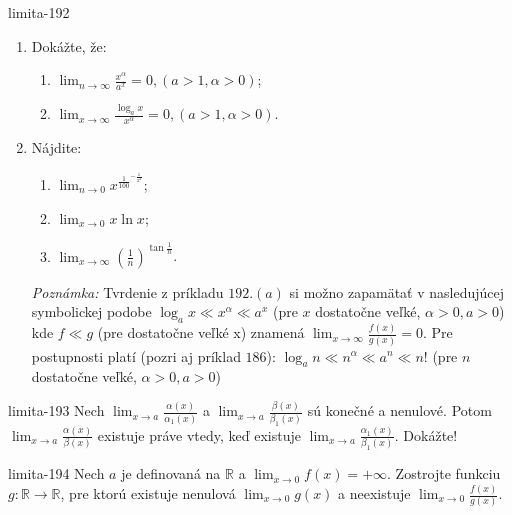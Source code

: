 \begin{defproblem}{limita-192}
\begin{enumerate}
\item Dokážte, že:
\begin{multicols}{2}
\begin{enumerate}
    \item $\lim_{n \rightarrow \infty} \frac{x^{\alpha}}{a^x}=0,(a>1,\alpha>0)$;
    \item $\lim_{x \rightarrow \infty} \frac{\log_a x}{x^\alpha}=0,(a>1,\alpha >0)$.
\end{enumerate}
\end{multicols}
\item Nájdite:
\begin{multicols}{2}
\begin{enumerate}
    \item $\lim_{n \rightarrow 0} x^{\frac{1}{100}^{-\frac{1}{x^2}}}$;
    \item $\lim_{x \rightarrow 0} x \ln x$;
    \item $\lim_{x \rightarrow \infty} (\frac{1}{n})^{\tan \frac{1}{n}}$.
\end{enumerate}
\end{multicols}
\textit{Poznámka:}
Tvrdenie z príkladu $192.(a)$ si možno zapamätať v nasledujúcej symbolickej podobe $\log_a x\ll x^\alpha \ll a^x$ (pre $x$ dostatočne veľké, $\alpha >0, a>0$)
kde $f\ll g$ (pre dostatočne veľké x) znamená $\lim_{x \rightarrow \infty} \frac{f(x)}{g(x)}=0$.
Pre postupnosti platí (pozri aj príklad $186$):
$\log_a n\ll n^\alpha\ll a^n\ll n!$ (pre $n$ dostatočne veľké,  $\alpha >0, a>0$)
\end{enumerate}
\end{defproblem}

\begin{defproblem}{limita-193}
Nech $\lim_{x \rightarrow a} \frac{\alpha (x)}{\alpha_1 (x)}$ a $\lim_{x \rightarrow a} \frac{\beta (x)}{\beta_1(x)}$ sú konečné a nenulové. Potom $\lim_{x \rightarrow a} \frac{\alpha (x)}{\beta (x)}$ existuje práve vtedy, keď existuje $\lim_{x \rightarrow a} \frac{\alpha_1 (x)}{\beta_1 (x)}$. Dokážte!
\end{defproblem}

\begin{defproblem}{limita-194}
Nech $a$ je definovaná na $\mathbb{R}$ a $\lim_{x \rightarrow 0} f(x)=+\infty$. Zostrojte funkciu $g: \mathbb{R} \rightarrow \mathbb{R}$, pre ktorú existuje nenulová $\lim_{x \rightarrow 0} g(x)$ a neexistuje $\lim_{x \rightarrow 0} \frac{f(x)}{g(x)}$.
\end{defproblem}

